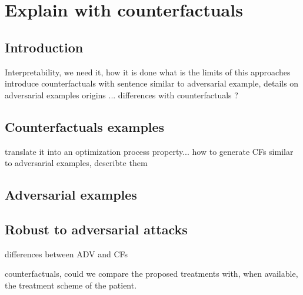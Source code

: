 \documentclass[../main.tex]{subfiles}
\begin{document}
\chapter{Explain with counterfactuals}\label{chap:counterfactuals}
\graphicspath{{./figures/6-Interpretability}}
\minitocpage

\section{Introduction}
 Interpretability, we need it, how it is done
 what is the limits of this approaches
 introduce counterfactuals with sentence
 similar to adversarial example, details on adversarial examples
 origins ...
 differences with counterfactuals ?
\section{Counterfactuals examples}
 translate it into an optimization process
 property...
 how to generate CFs
 similar to adversarial examples, describte them
\section{Adversarial examples}
 \cite{SzegedyZSBEGF13}
\section{Robust to adversarial attacks}

 differences between ADV and CFs





 counterfactuals, could we compare the proposed treatments with, when available, the treatment scheme of the patient.
\end{document}
